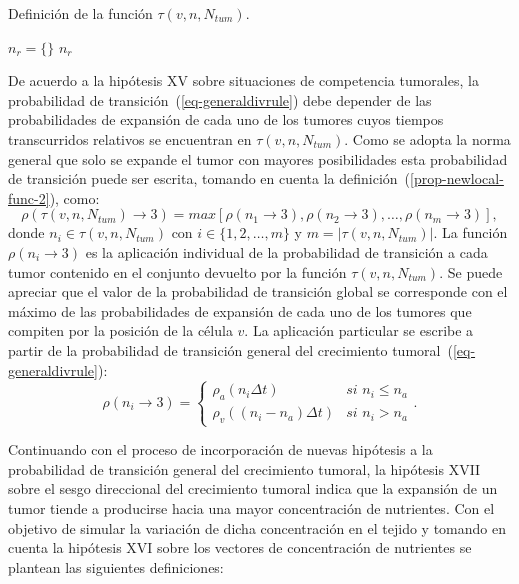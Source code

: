 \begin{algorithm}[t]
\caption{Definici\'on de la funci\'on $\tau(v,n,N_{tum})$.} \label{alg-n-r-2}
$n_r = \lbrace \rbrace$\;
\Return $n_r$\;
\end{algorithm}

De acuerdo a la hip\'otesis XV sobre situaciones de competencia tumorales, la probabilidad de transici\'on~(\ref{eq-generaldivrule}) debe depender de las probabilidades de expansi\'on de cada uno de los tumores cuyos tiempos transcurridos relativos se encuentran en $\tau(v,n,N_{tum})$. Como se adopta la norma general que solo se expande el tumor con mayores posibilidades esta probabilidad de transici\'on puede ser escrita, tomando en cuenta la definici\'on~(\ref{prop-newlocal-func-2}), como:
\begin{equation}
\rho(\tau(v,n,N_{tum}) \rightarrow 3) = max\left[\rho(n_1 \rightarrow 3),\rho(n_2 \rightarrow 3),\ldots, \rho(n_m \rightarrow 3)\right], \label{eq-generaldivrule-2}
\end{equation}
donde $n_i \in \tau(v,n,N_{tum})$ con $i \in \lbrace 1,2,\ldots,m \rbrace$ y $m=|\tau(v,n,N_{tum})|$. La funci\'on $\rho(n_i \rightarrow 3)$ es la aplicaci\'on individual de la probabilidad de transici\'on a cada tumor contenido en el conjunto devuelto por la funci\'on $\tau(v,n,N_{tum})$. Se puede apreciar que el valor de la probabilidad de transici\'on global se corresponde con el m\'aximo de las probabilidades de expansi\'on de cada uno de los tumores que compiten por la posici\'on de la c\'elula $v$. La aplicaci\'on particular se escribe a partir de la probabilidad de transici\'on general del crecimiento tumoral~(\ref{eq-generaldivrule}):
\begin{equation}
\rho(n_i \rightarrow 3) = \left\lbrace
	\begin{array}{ll}
		\rho_a(n_i \Delta t)& \textit{si } n_i \leq n_a \\
		\rho_v((n_i - n_a) \Delta t)& \textit{si } n_i > n_a
	\end{array}
\right.. \label{eq-generaldivrule-3}
\end{equation}

Continuando con el proceso de incorporaci\'on de nuevas hip\'otesis a la probabilidad de transici\'on general del crecimiento tumoral, la hip\'otesis XVII sobre el sesgo direccional del crecimiento tumoral indica que la expansi\'on de un tumor tiende a producirse hacia una mayor concentraci\'on de nutrientes. Con el objetivo de simular la variaci\'on de dicha concentraci\'on en el tejido y tomando en cuenta la hip\'otesis XVI sobre los vectores de concentraci\'on de nutrientes se plantean las siguientes definiciones:

